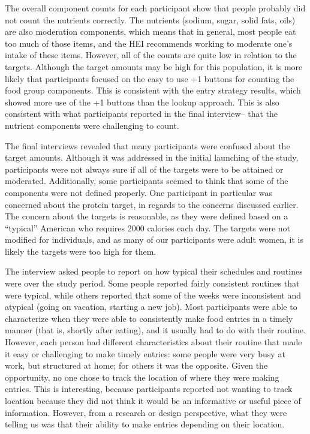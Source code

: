The overall component counts for each participant show that people probably did not count the nutrients correctly. The nutrients (sodium, sugar, solid fats, oils) are also moderation components, which means that in general, most people eat too much of those items, and the HEI recommends working to moderate one's intake of these items. However, all of the counts are quite low in relation to the targets. Although the target amounts may be high for this population, it is more likely that participants focused on the easy to use +1 buttons for counting the food group components. This is consistent with the entry strategy results, which showed more use of the +1 buttons than the lookup approach. This is also consistent with what participants reported in the final interview-- that the nutrient components were challenging to count. 

The final interviews revealed that many participants were confused about the target amounts. Although it was addressed in the initial launching of the study, participants were not always sure if all of the targets were to be attained or moderated. Additionally, some participants seemed to think that some of the components were not defined properly. One participant in particular was concerned about the protein target, in regards to the concerns discussed earlier. The concern about the targets is reasonable, as they were defined based on a ``typical'' American who requires 2000 calories each day. The targets were not modified for individuals, and as many of our participants were adult women, it is likely the targets were too high for them. 

The interview asked people to report on how typical their schedules and routines were over the study period. Some people reported fairly consistent routines that were typical, while others reported that some of the weeks were inconsistent and atypical (going on vacation, starting a new job). Most participants were able to characterize when they were able to consistently make food entries in a timely manner (that is, shortly after eating), and it usually had to do with their routine. However, each person had different characteristics about their routine that made it easy or challenging to make timely entries: some people were very busy at work, but structured at home; for others it was the opposite. Given the opportunity, no one chose to track the location of where they were making entries. This is interesting, because participants reported not wanting to track location because they did not think it would be an informative or useful piece of information. However, from a research or design perspective, what they were telling us was that their ability to make entries depending on their location. 

